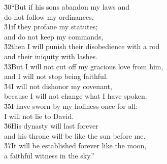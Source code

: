 \begin{poetry}
\poeml \v{30}``But if his sons abandon my laws and \\
\poemll    do not follow my ordinances, \\
\poeml \v{31}if they profane my statutes; \\
\poemll    and do not keep my commands, \\
\poeml \v{32}then I will punish their disobedience with a rod \\
\poemll    and their iniquity with lashes. \\
\poeml \v{33}But I will not cut off my gracious love from him, \\
\poemll    and I will not stop being faithful. \\
\poeml \v{34}I will not dishonor my covenant, \\
\poemll    because I will not change what I have spoken. \\
\poeml \v{35}I have sworn by my holiness once for all: \\
\poemll    I will not lie to David. \\
\poeml \v{36}His dynasty will last forever \\
\poemll    and his throne will be like the sun before me. \\
\poeml \v{37}It will be established forever like the moon, \\
\poemll    a faithful witness in the sky.''
\end{poetry}

